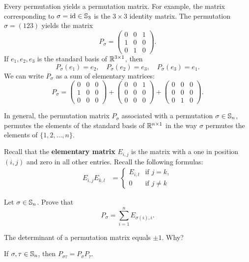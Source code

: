 Every permutation yields a permutation matrix. For example, 
the matrix corresponding to $\sigma=\operatorname{id}\in\mathbb{S}_3$ 
is the $3\times 3$ identity matrix. The permutation
$\sigma=(123)$ yields the matrix 
\[
P_\sigma=\begin{pmatrix}0&0&1\\1&0&0\\0&1&0\end{pmatrix}.
\]
If $e_1,e_2,e_3$ is the standard basis of $\mathbb{R}^{3\times1}$, then
\[
P_{\sigma}(e_1)=e_2,
\quad 
P_{\sigma}(e_2)=e_3,
\quad 
P_{\sigma}(e_3)=e_1.
\]
We can write $P_\sigma$ as a sum
of elementary matrices: 
\[
P_\sigma=\begin{pmatrix}
    0&0&0\\
    1&0&0\\
    0&0&0
\end{pmatrix}
+\begin{pmatrix}
    0&0&1\\
    0&0&0\\
    0&0&0
\end{pmatrix}
+\begin{pmatrix}
    0&0&0\\
    0&0&0\\
    0&1&0
\end{pmatrix}.
\]

In general, the permutation matrix
$P_\sigma$ associated with a permutation 
$\sigma\in\mathbb{S}_n$, permutes the elements of the standard basis
of $\mathbb{R}^{n\times1}$ in the way $\sigma$ permutes 
the elements of $\{1,2,\dots,n\}$.

Recall that the 
\textbf{elementary matrix} 
$E_{i,j}$ is the matrix with a one in position
$(i,j)$ and zero in all other entries. Recall the
following formulas: 
\begin{align*}
E_{i,j}E_{k,l}&=\begin{cases}
E_{i,l} & \text{if $j=k$},\\
0 & \text{if $j\ne k$}
\end{cases}
\end{align*}

\begin{exercise}
\label{xca:permutation_matrix}
Let $\sigma\in\mathbb{S}_n$. Prove that
\[
P_\sigma=\sum_{i=1}^n E_{\sigma(i),i}.
\]
\end{exercise}

The determinant of a permutation matrix equals 
$\pm1$. Why? 

\begin{proposition}
If $\sigma,\tau\in\mathbb{S}_n$, then $P_{\sigma\tau}=P_\sigma P_\tau$.
\end{proposition}

